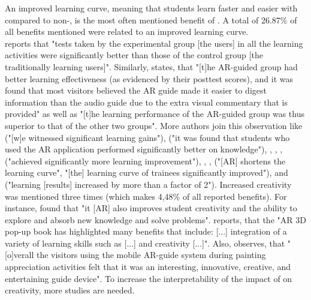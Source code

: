 {
An improved learning curve, meaning that students learn faster and easier with \AR \apps compared to non-\AR \appsns, is the most often mentioned benefit of \ARns. A total of 26.87\% of all benefits mentioned were related to an improved learning curve. \\
\cite{Liu.2009} reports that "tests taken by the experimental group [the \AR \app users] in all the learning activities were significantly better than those of the control group [the traditionally learning users]".\autocite[525]{Liu.2009} Similarly, \cite{Chang.2014} states, that "[t]he AR-guided group had better learning effectiveness (as evidenced by their posttest scores), and it was found that most visitors believed the AR guide made it easier to digest information than the audio guide due to the extra visual commentary that is provided"\autocite[193]{Chang.2014} as well as "[t]he learning performance of the AR-guided group was thus superior to
that of the other two groups"\autocite[190]{Chang.2014}. More authors join this observation like \cite{Kamarainen.2013} ("[w]e witnessed significant learning gains"\autocite[550]{Kamarainen.2013}), \cite{Ibanez.2014} ("it was found that students who used the AR application performed significantly better on knowledge"\autocite[12]{Ibanez.2014}), \cite{Li.2011}, \cite{MartinGutierrez.2011}, \cite{Redondo.2013}, \cite{Liu.2009b} ("achieved significantly more learning improvement"\autocite[173]{Liu.2009b}), \cite{Zhang.2014}, \cite{Yeo.2011}, \cite{Hou.2013} ("[AR] shortens the learning curve"\autocite[450]{Hou.2013}, "[the] learning curve of trainees significantly improved"\autocite[451]{Hou.2013}), \cite{Wilson.2013} and \cite{Anderson.2013} ("learning [results] increased by more than a factor of 2"\autocite[318]{Anderson.2013}). 
Increased creativity was mentioned three times (which makes 4,48\% of all reported benefits). For instance, \cite{Liu.2009b} found that "it [AR] also improves student creativity and the ability to explore and absorb new knowledge and solve problems"\autocite[173]{Liu.2009b}. \cite{VateULan.2012} reports, that the "AR 3D pop-up book has highlighted many benefits that include: [...] integration of a variety of learning skills such as [...] and creativity [...]"\autocite[894]{VateULan.2012}. Also, \cite{Chang.2014} observes, that "[o]verall the visitors using the mobile AR-guide system during painting appreciation activities felt that it was an interesting, innovative, creative, and entertaining guide device"\autocite[194]{Chang.2014}. To increase the interpretability of the impact of \AR \apps on creativity, more studies are needed.
% 
}

